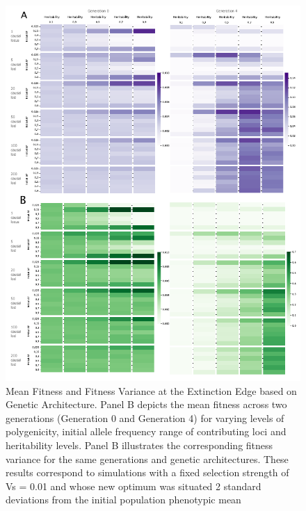 \documentclass{article}
\begin{document}
\begin{figure}[b]
    \centering
    \includegraphics[width=1\textwidth]{figures/meanfitness_varfitness_gen0to4.pdf}
    \caption{Mean Fitness and Fitness Variance at the Extinction Edge based on Genetic Architecture. Panel B depicts the mean fitness across two generations (Generation 0 and Generation 4) for varying levels of polygenicity, initial allele frequency range of contributing loci and heritability levels. Panel B illustrates the corresponding fitness variance for the same generations and genetic architectures. These results correspond to simulations with a fixed selection strength of Vs = 0.01 and whose new optimum was situated 2 standard deviations from the initial population phenotypic mean}
    \label{fig:meanfitness_varfitness_gen0to4}
\end{figure}
\end{document}
